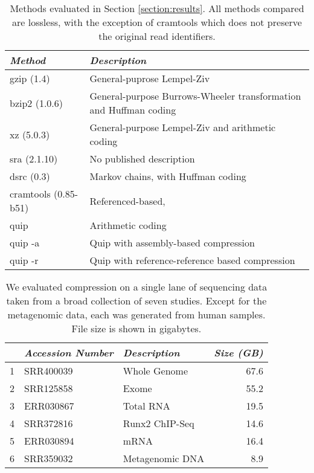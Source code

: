\documentclass[twocolumn]{article}
\begin{document}
\begin{table}
\begin{tabular}{lp{}}
\textit{Method} & \textit{Description} \\ \hline
gzip (1.4)      & General-puprose Lempel-Ziv \\
bzip2 (1.0.6)   &
General-purpose Burrows-Wheeler transformation and Huffman coding \\
xz  (5.0.3)     &
General-purpose Lempel-Ziv and arithmetic coding \\
sra (2.1.10)           & No published description \\
dsrc (0.3) & Markov chains,  with Huffman coding \\
cramtools (0.85-b51)  & Referenced-based, \\
quip            & Arithmetic coding \\
quip -a         & Quip with assembly-based compression \\
quip -r         &
Quip with reference-reference based compression \\
\end{tabular}
\caption{Methods evaluated in Section \ref{section:results}.
All methods compared are lossless, with the exception of cramtools which
does not preserve the original read identifiers.}
\label{tab:methods}
\end{table}


\begin{table}
\begin{tabular}{rllr}
  & \textit{Accession Number} & \textit{Description} & \textit{Size (GB)} \\ \hline
1 & SRR400039                 & Whole Genome         & 67.6 \\
2 & SRR125858                 & Exome                & 55.2 \\
3 & ERR030867                 & Total RNA            & 19.5 \\
4 & SRR372816                 & Runx2 ChIP-Seq       & 14.6 \\
5 & ERR030894                 & mRNA                 & 16.4 \\
6 & SRR359032                 & Metagenomic DNA      &  8.9 \\
\end{tabular}
\caption{
We evaluated compression on a single lane of sequencing data taken from a
broad collection of seven studies. Except for the metagenomic data, each was
generated from human samples. File size is shown in gigabytes.
}
\label{tab:datasets}
\end{table}
\end{document}
